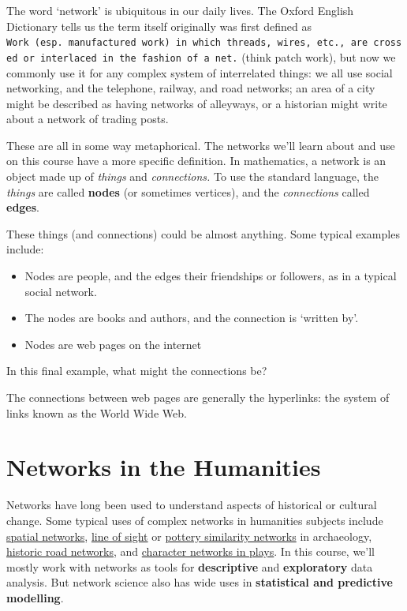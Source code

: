 \documentclass[
]{book}
\begin{document}
The word `network' is ubiquitous in our daily lives. The Oxford English Dictionary tells us the term itself originally was first defined as \texttt{Work\ (esp.\ manufactured\ work)\ in\ which\ threads,\ wires,\ etc.,\ are\ crossed\ or\ interlaced\ in\ the\ fashion\ of\ a\ net.} (think patch work), but now we commonly use it for any complex system of interrelated things: we all use social networking, and the telephone, railway, and road networks; an area of a city might be described as having networks of alleyways, or a historian might write about a network of trading posts.

These are all in some way metaphorical. The networks we'll learn about and use on this course have a more specific definition. In mathematics, a network is an object made up of \emph{things} and \emph{connections.} To use the standard language, the \emph{things} are called \textbf{nodes} (or sometimes vertices), and the \emph{connections} called \textbf{edges}.

These things (and connections) could be almost anything. Some typical examples include:

\begin{itemize}
\item
  Nodes are people, and the edges their friendships or followers, as in a typical social network.
\item
  The nodes are books and authors, and the connection is `written by'.
\item
  Nodes are web pages on the internet
\end{itemize}

In this final example, what might the connections be?

The connections between web pages are generally the hyperlinks: the system of links known as the World Wide Web.

\hypertarget{networks-in-the-humanities}{%
\section{Networks in the Humanities}\label{networks-in-the-humanities}}

Networks have long been used to understand aspects of historical or cultural change. Some typical uses of complex networks in humanities subjects include \href{https://model-articles.rrchnm.org/articles/midura/}{spatial networks}, \href{https://www.frontiersin.org/articles/10.3389/fdigh.2017.00017/full}{line of sight} or \href{https://academic.oup.com/book/40384/chapter-abstract/347130019?redirectedFrom=fulltext}{pottery similarity networks} in archaeology, \href{https://www.landesgeschichte.uni-goettingen.de/handelsstrassen/index.php}{historic road networks}, and \href{http://www.martingrandjean.ch/network-visualization-shakespeare/}{character networks in plays}. In this course, we'll mostly work with networks as tools for \textbf{descriptive} and \textbf{exploratory} data analysis. But network science also has wide uses in \textbf{statistical and predictive modelling}.
\end{document}
